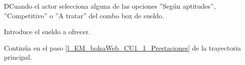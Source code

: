 	\begin{UCtrayectoriaA}{D}{Cuando el actor selecciona alguna de las opciones ''Según aptitudes'', ''Competitivo'' o ''A tratar'' del combo box de sueldo.}

		\UCpaso [\UCactor] Introduce el sueldo a ofrecer.

		\UCpaso Continúa en el paso \ref{l_EM_bolsaWeb_CU1_1_Prestaciones} de la trayectoria principal.

	\end{UCtrayectoriaA}

